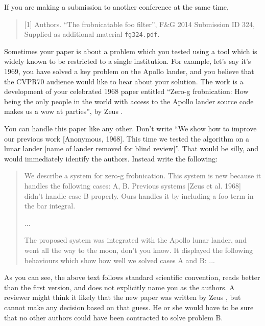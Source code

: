 \documentclass[10pt,twocolumn,letterpaper]{article}
\begin{document}
If you are making a submission to another conference at the same time,
\begin{quote}
[1] Authors. ``The frobnicatable foo filter'', F\&G 2014 Submission ID 324,
Supplied as additional material {\tt fg324.pdf}.
\end{quote}


Sometimes your paper is about a problem which you tested using a tool which
is widely known to be restricted to a single institution.  For example,
let's say it's 1969, you have solved a key problem on the Apollo lander,
and you believe that the CVPR70 audience would like to hear about your
solution.  The work is a development of your celebrated 1968 paper entitled
``Zero-g frobnication: How being the only people in the world with access to
the Apollo lander source code makes us a wow at parties'', by Zeus \etal.

You can handle this paper like any other.  Don't write ``We show how to
improve our previous work [Anonymous, 1968].  This time we tested the
algorithm on a lunar lander [name of lander removed for blind review]''.
That would be silly, and would immediately identify the authors. Instead
write the following:
\begin{quotation}
\noindent
   We describe a system for zero-g frobnication.  This
   system is new because it handles the following cases:
   A, B.  Previous systems [Zeus et al. 1968] didn't
   handle case B properly.  Ours handles it by including
   a foo term in the bar integral.

   ...

   The proposed system was integrated with the Apollo
   lunar lander, and went all the way to the moon, don't
   you know.  It displayed the following behaviours
   which show how well we solved cases A and B: ...
\end{quotation}
As you can see, the above text follows standard scientific convention,
reads better than the first version, and does not explicitly name you as
the authors.  A reviewer might think it likely that the new paper was
written by Zeus \etal, but cannot make any decision based on that guess.
He or she would have to be sure that no other authors could have been
contracted to solve problem B.
\medskip
\end{document}
